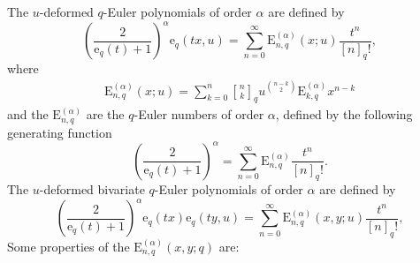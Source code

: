\documentclass[12pt]{article}
\newcommand{\qbinom}{\genfrac{[}{]}{0pt}{}}
\newcommand{\e}{\mathrm{e}}
\newcommand{\E}{\mathrm{E}}
\begin{document}
The $u$-deformed $q$-Euler polynomials of order $\alpha$ are defined by
\begin{equation}
    \left(\frac{2}{\e_{q}(t)+1}\right)^{\alpha}\e_{q}(tx,u)=\sum_{n=0}^{\infty}\E_{n,q}^{(\alpha)}(x;u)\frac{t^{n}}{[n]_{q}!},
\end{equation}
where
\begin{align}
        \E_{n,q}^{(\alpha)}(x;u)=\sum_{k=0}^{n}\qbinom{n}{k}_{q}u^{\binom{n-k}{2}}\E_{k,q}^{(\alpha)}x^{n-k}
\end{align}
and the $\E_{n,q}^{(\alpha)}$ are the $q$-Euler numbers of order $\alpha$, defined by the following generating function
\begin{equation}\label{eqn_qEulerNum}
        \left(\frac{2}{\e_{q}(t)+1}\right)^{\alpha}=\sum_{n=0}^{\infty}\E_{n,q}^{(\alpha)}\frac{t^n}{[n]_{q}!}.
    \end{equation}    
The $u$-deformed bivariate $q$-Euler polynomials of order $\alpha$ are defined by
\begin{equation}
    \left(\frac{2}{\e_{q}(t)+1}\right)^{\alpha}\e_{q}(tx)\e_{q}(ty,u)=\sum_{n=0}^{\infty}\E_{n,q}^{(\alpha)}(x,y;u)\frac{t^{n}}{[n]_{q}!},
\end{equation}
Some properties of the $\E_{n,q}^{(\alpha)}(x,y;q)$ are:
\end{document}
